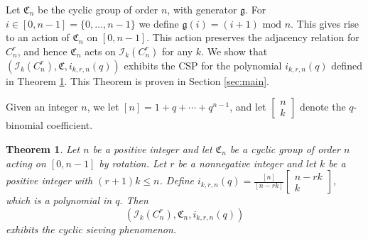 \documentclass[12pt]{article}
\newtheorem{theorem}{Theorem}%
\theoremstyle{definition}
\newcommand{\gau}[2]{\left[ \begin{array}{c} #1 \\ #2 \end{array} \right]}
\begin{document}
Let $\mathfrak{C}_n$ be the cyclic group of order $n$, with generator $\mathfrak{g}$. For $i \in [0,n-1] = \{0, \ldots, n-1 \}$ we define $\mathfrak{g}(i) = (i+1) \mbox{ mod } n$. This gives rise to an action of $\mathfrak{C}_n$ on $[0,n-1]$. This action preserves the adjacency relation for $C_n^r$, and hence $\mathfrak{C}_n$ acts on $\mathcal{I}_k(C_n^r)$ for any $k.$ We show that $(\mathcal{I}_k(C_n^r), \mathfrak{C}, i_{k,r,n}(q))$ exhibits the CSP for the polynomial $i_{k,r,n}(q)$ defined in Theorem \ref{thm:main}. This Theorem is proven in Section \ref{sec:main}.

Given an integer $n$, we let $[n] = 1 + q + \cdots + q^{n-1}$, and let $\gau{n}{k}$ denote the $q$-binomial coefficient. 
\begin{theorem}
Let $n$ be a positive integer and let $\mathfrak{C}_n$ be a cyclic group of order $n$ acting on $[0,n-1]$ by rotation. Let $r$ be a nonnegative integer and let $k$ be a positive integer with $(r+1)k \leq n$. 
Define $i_{k,r,n}(q) = \frac{[n]}{[n-rk]}\gau{n-rk}{k}$, which is a polynomial in $q.$
Then \[\left(\mathcal{I}_k(C_n^r), \mathfrak{C}_n, i_{k,r,n}(q)\right)\] exhibits the cyclic sieving phenomenon.
\label{thm:main}
\end{theorem}
\end{document}
